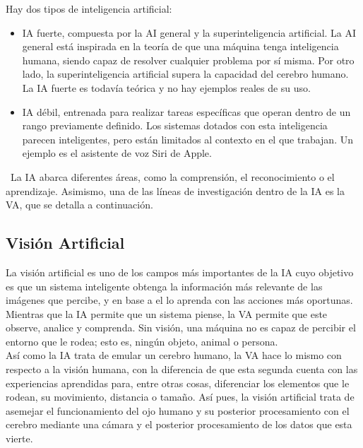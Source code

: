 Hay dos tipos de inteligencia artificial:
\begin{itemize}
 \item{IA fuerte,} compuesta por la AI general y la superinteligencia artificial. La AI general está inspirada en la teoría de que una máquina tenga inteligencia humana, siendo capaz de resolver cualquier problema por sí misma. Por otro lado, la superinteligencia artificial supera la capacidad del cerebro humano. La IA fuerte es todavía teórica y no hay ejemplos reales de su uso.
  \item{IA débil,} entrenada para realizar tareas específicas que operan dentro de un rango previamente definido. Los sistemas dotados con esta inteligencia parecen inteligentes, pero están limitados al contexto en el que trabajan. Un ejemplo es el asistente de voz Siri de Apple.
\end{itemize}\
La IA abarca diferentes áreas, como la comprensión, el reconocimiento o el aprendizaje. Asimismo, una de las líneas de investigación dentro de la IA es la VA, que se detalla a continuación.\\

\subsection{Visión Artificial}
\label{sec:subseccion}
La visión artificial es uno de los campos más importantes de la IA cuyo objetivo es que un sistema inteligente obtenga la información más relevante de las imágenes que percibe, y en base a el lo aprenda con las acciones más oportunas.\\
Mientras que la IA permite que un sistema piense, la VA permite que este observe, analice y comprenda. Sin visión, una máquina no es capaz de percibir el entorno que le rodea; esto es, ningún objeto, animal o persona. \\
Así como la IA trata de emular un cerebro humano, la VA hace lo mismo con respecto a la visión humana, con la diferencia de que esta segunda cuenta con las experiencias aprendidas para, entre otras cosas, diferenciar los elementos que le rodean, su movimiento, distancia o tamaño. Así pues, la visión artificial trata de asemejar el funcionamiento del ojo humano y su posterior procesamiento con el cerebro mediante  una cámara y el posterior procesamiento de los datos que esta vierte.\\

